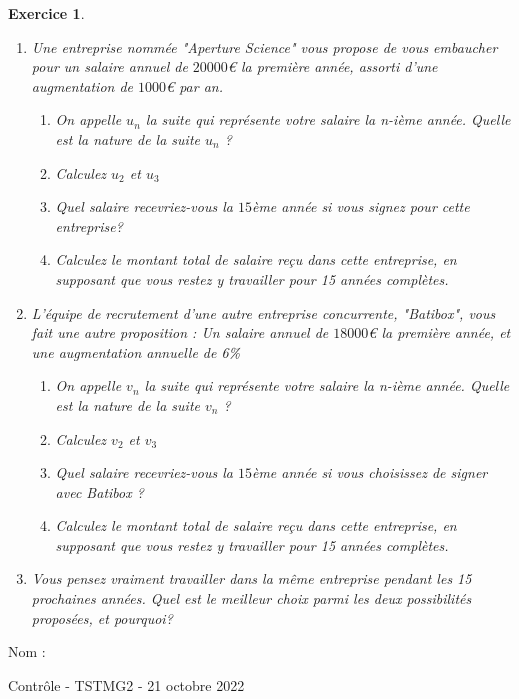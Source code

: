 \documentclass[11pt,a4paper]{exam}
\newtheorem{exo}{Exercice}
\begin{document}
\begin{exo}
\begin{enumerate}
    \item Une entreprise nommée "Aperture Science" vous propose de vous embaucher pour un salaire annuel de $20000$€ la première année, assorti d'une augmentation de $1000$€ par an.
    \begin{enumerate}
        \item On appelle $u_n$ la suite qui représente votre salaire la n-ième année. Quelle est la nature de la suite $u_n$ ? 
        \item Calculez $u_2$ et $u_3$
        \item Quel salaire recevriez-vous la $15$ème année si vous signez pour cette entreprise?
        \item Calculez le montant total de salaire reçu dans cette entreprise, en supposant que vous restez y travailler pour 15 années complètes.
    \end{enumerate}
    \item L'équipe de recrutement d'une autre entreprise concurrente, "Batibox", vous fait une autre proposition : Un salaire annuel de $18000$€ la première année, et une augmentation annuelle de 6\%
    \begin{enumerate}
        \item On appelle $v_n$ la suite qui représente votre salaire la n-ième année. Quelle est la nature de la suite $v_n$ ? 
        \item Calculez $v_2$ et $v_3$
        \item Quel salaire recevriez-vous la $15$ème année si vous choisissez de signer avec Batibox ?
        \item Calculez le montant total de salaire reçu dans cette entreprise, en supposant que vous restez y travailler pour 15 années complètes.
    \end{enumerate}
    \item Vous pensez vraiment travailler dans la même entreprise pendant les 15 prochaines années. Quel est le meilleur choix parmi les deux possibilités proposées, et pourquoi?  
\end{enumerate}
\end{exo}
\newpage
\setcounter{exo}{0}
\begin{minipage}{0.15\textwidth}
    Nom : 
\end{minipage}
\begin{minipage}{0.8\textwidth}
    \begin{flushright}
        Contrôle - TSTMG2 - 21 octobre 2022
    \end{flushright}
\end{minipage}
\vspace{3pt}
\hline
\vspace{3pt}
\end{document}
